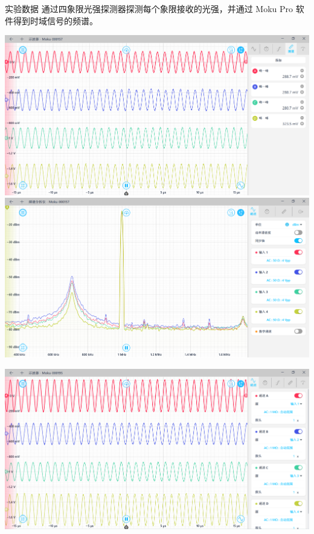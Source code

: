 \documentclass{beamer}
\begin{document}
\begin{frame}{实验数据}
    通过四象限光强探测器探测每个象限接收的光强，并通过 Moku Pro 软件得到时域信号的频谱。
    \begin{minipage}{0.5\textwidth}
        \includegraphics[width=\linewidth, height=0.45\textheight, keepaspectratio]{image/3.png}
        \includegraphics[width=\linewidth, height=0.45\textheight, keepaspectratio]{image/4.png}
    \end{minipage}%
    \begin{minipage}{0.5\textwidth}
        \includegraphics[width=\linewidth, height=0.45\textheight, keepaspectratio]{image/5.png}

\end{minipage}
\end{frame}
\end{document}
